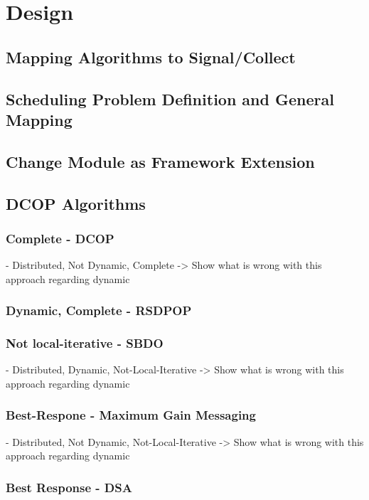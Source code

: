 \chapter{Design}
\section{Mapping Algorithms to Signal/Collect}
\section{Scheduling Problem Definition and General Mapping}
\section{Change Module as Framework Extension}

\section{DCOP Algorithms}
\subsection{Complete - DCOP}

- Distributed, Not Dynamic, Complete -> Show what is wrong with this approach regarding dynamic

\subsection{Dynamic, Complete - RSDPOP}

\subsection{Not local-iterative - SBDO}

- Distributed, Dynamic, Not-Local-Iterative -> Show what is wrong with this approach regarding dynamic

\subsection{Best-Respone - Maximum Gain Messaging}

- Distributed, Not Dynamic, Not-Local-Iterative -> Show what is wrong with this approach regarding dynamic

\subsection{Best Response - DSA}

